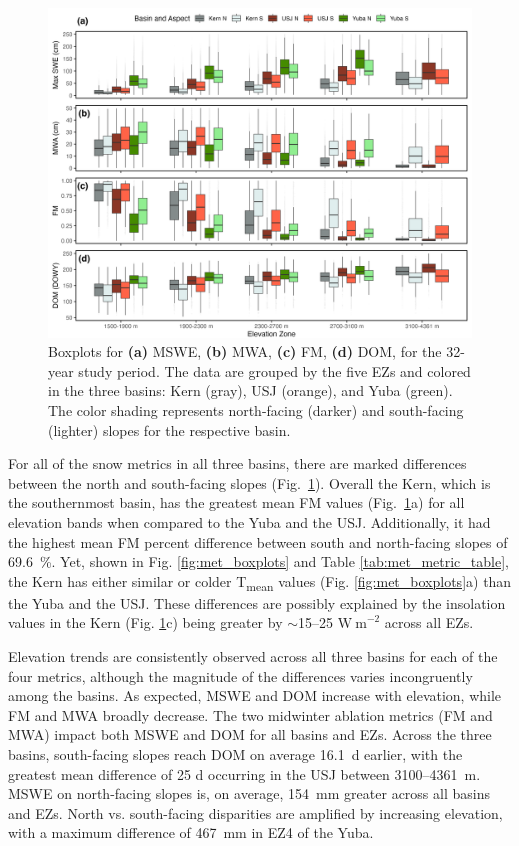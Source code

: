 \begin{figure}[t]
\includegraphics[width=\textwidth]{figures/ch2_figs/snow4_boxplot_v5.png}
\caption{Boxplots for \textbf{(a)} MSWE, \textbf{(b)} MWA, \textbf{(c)} FM, \textbf{(d)} DOM, for the 32-year study period. The data are grouped by the five EZs and colored in the three basins: Kern (gray), USJ (orange), and Yuba (green). The color shading represents north-facing (darker) and south-facing (lighter) slopes for the respective basin.}
\label{fig:snow_boxplots}
\end{figure}

For all of the snow metrics in all three basins, there are marked differences between the north and south-facing slopes (Fig.~\ref{fig:snow_boxplots}). Overall the Kern, which is the southernmost basin, has the greatest mean FM values (Fig.~\ref{fig:snow_boxplots}a) for all elevation bands when compared to the Yuba and the USJ. Additionally, it had the highest mean FM percent difference between south and north-facing slopes of 69.6~\%. Yet, shown in Fig. \ref{fig:met_boxplots} and Table \ref{tab:met_metric_table}, the Kern has either similar or colder T\textsubscript{mean} values (Fig. \ref{fig:met_boxplots}a) than the Yuba and the USJ. These differences are possibly explained by the insolation values in the Kern (Fig. \ref{fig:snow_boxplots}c) being greater by $\sim$15--25 $\mathrm{W~m}^{-2}$ across all EZs. 

Elevation trends are consistently observed across all three basins for each of the four metrics, although the magnitude of the differences varies incongruently among the basins. As expected, MSWE and DOM increase with elevation, while FM and MWA broadly decrease. The two midwinter ablation metrics (FM and MWA) impact both MSWE and DOM for all basins and EZs. Across the three basins, south-facing slopes reach DOM on average 16.1~d earlier, with the greatest mean difference of 25 d occurring in the USJ between 3100--4361~m. MSWE on north-facing slopes is, on average, 154~mm greater across all basins and EZs. North vs. south-facing disparities are amplified by increasing elevation, with a maximum difference of 467~mm in EZ4 of the Yuba.

